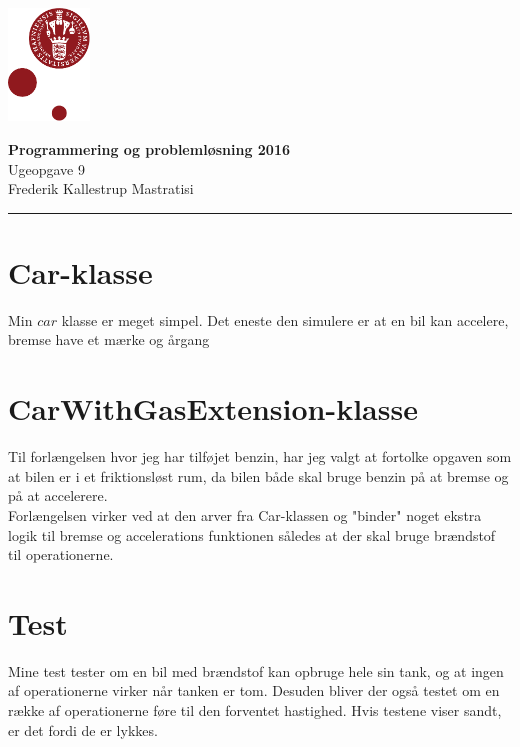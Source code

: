 \documentclass[12pt, a4paper, hidelinks]{article}
\begin{document}
\begin{minipage}[b]{1.0\linewidth}
\includegraphics[height=30mm]{KULogo}

\vspace*{-16ex}
\begin{center}
    {\Large \bf Programmering og problemløsning 2016} \vspace*{1ex} \\
    {\large Ugeopgave 9} \vspace*{1ex} \\
    {\large Frederik Kallestrup Mastratisi}
\end{center}
\vspace*{-3pt}
{\color{KU-red}\hrule}
\end{minipage}
\vspace{2ex}

\tableofcontents \newpage

\setcounter{section}{0}
\setcounter{subsection}{-1}


\section{Car-klasse}
Min $car$ klasse er meget simpel. Det eneste den simulere er at en bil kan accelere, bremse have et mærke og årgang \\

\section{CarWithGasExtension-klasse}Til forlængelsen hvor jeg har tilføjet benzin, har jeg valgt at fortolke opgaven som at bilen er i et friktionsløst rum, da bilen både skal bruge benzin på at bremse og på at accelerere. \\

Forlængelsen virker ved at den arver fra Car-klassen og "binder" noget ekstra logik til bremse og accelerations funktionen således at der skal bruge brændstof til operationerne. 

\section{Test}
Mine test tester om en bil med brændstof kan opbruge hele sin tank, og at ingen af operationerne virker når tanken er tom. Desuden bliver der også testet om en række af operationerne føre til den forventet hastighed. Hvis testene viser sandt, er det fordi de er lykkes.



\end{document}

